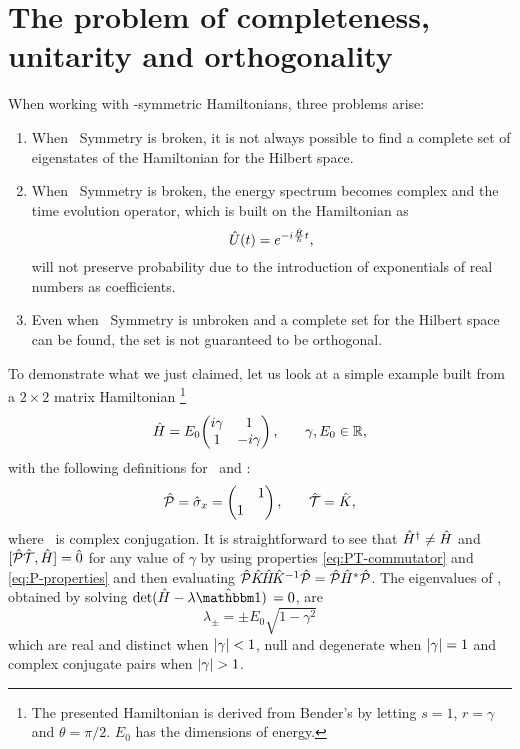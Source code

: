     \section{The problem of completeness, unitarity and orthogonality}\label{s:problem}
        When working with \PT-symmetric Hamiltonians, three problems arise:
        \begin{enumerate}[label = \mybullet]
            \item When \PT\ Symmetry is broken, it is not always possible to find a complete set of eigenstates of the Hamiltonian for the Hilbert space.
            \item When \PT\ Symmetry is broken, the energy spectrum becomes complex and the time evolution operator, which is built on the Hamiltonian as 
            \begin{equation}
                \label{eq:time-evolution}
                \hU\pqty{t} = \myexp{-i\frac{\hH}{\hbar}t}
                \mycomma
            \end{equation}
            will not preserve probability due to the introduction of exponentials of real numbers as coefficients.
            \item Even when \PT\ Symmetry is unbroken and a complete set for the Hilbert space can be found, the set is not guaranteed to be orthogonal.
        \end{enumerate}
        To demonstrate what we just claimed, let us look at a simple example built from a $2\times2$ matrix Hamiltonian \cite{Bender2005,Bender2007}\footnote{The presented Hamiltonian is derived from Bender's by letting $s = 1$, $r = \gamma$ and $\theta = \pi/2$. $E_0$ has the dimensions of energy.}
        \begin{equation}
            \label{eq:ex:reduced-2x2-hamiltonian}
            \hH = E_0\! \pmqty{\dmat[1]{i\gamma, -i\gamma}}
            \mycomma\qquad
            \gamma,E_0\in\bbR
            \mycomma
        \end{equation}
        with the following definitions for \hP\ and \hT :
        \begin{equation}
            \label{eq:ex:reduced-2x2-P-T}
            \hP = \hat{\sigma}_x = \pmqty{\admat{1,1}}
            \mycomma\qquad
            \hT = \hK
            \mycomma
        \end{equation}
        where \hK\ is complex conjugation. It is straightforward to see that $\hat{H}^\dag \neq \hat{H}$ and $\comm*{\hPT}{\hH}\! = \hzero$ for any value of $\gamma$ by using properties \eqref{eq:PT-commutator} and \eqref{eq:P-properties} and then evaluating $\mathcal{\hat{P}}\hat{K}\!\hat{H}\!\hat{K}^{-1}\mathcal{\hat{P}} = \mathcal{\hat{P}}\hat{H}^*\mathcal{\hat{P}}$. The eigenvalues of \hH, obtained by solving $\det\!\pqty*{\hH - \lambda\hidM} = 0$, are
        \begin{equation*}
            \lambda_\pm = \pm E_0 \sqrt{1-\gamma^2}
        \end{equation*}
        which are real and distinct when $\abs{\gamma} < 1$, null and degenerate when $\abs{\gamma} = 1$ and complex conjugate pairs when $\abs{\gamma} > 1$.
        

